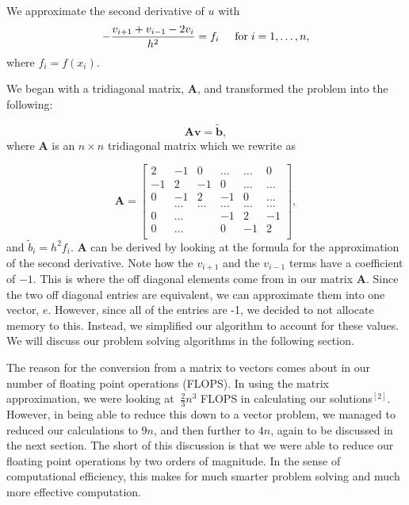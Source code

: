 \documentclass{article}
\begin{document}
We  approximate the second derivative of $u$ with
\begin{equation*}
-\frac{v_{i+1}+v_{i-1}-2v_i}{h^2} = f_i  \hspace{0.5cm} \mathrm{for} \hspace{0.1cm} i=1,\dots, n,
\end{equation*}
where $f_i=f(x_i)$.



We began with a tridiagonal matrix, $\mathbf{A}$, and transformed the problem into the following:

\begin{equation*}
\mathbf{A}\mathbf{v} = \tilde{\mathbf{b}},
\end{equation*}
where $\mathbf{A}$ is an $n\times n$  tridiagonal matrix which we rewrite as

\[
\mathbf{A} = \begin{bmatrix}
2& -1& 0 &\dots   & \dots &0 \\
-1 & 2 & -1 &0 &\dots &\dots \\
0&-1 &2 & -1 & 0 & \dots \\
& \dots   & \dots &\dots   &\dots & \dots \\
0&\dots   &  &-1 &2& -1 \\
0&\dots    &  & 0  &-1 & 2 \\
\end{bmatrix},
\]
and $\tilde{b}_i=h^2f_i$.  $\mathbf{A}$ can be derived by looking at the formula for the approximation of the second derivative. Note how the $v_{i+1}$ and the $v_{i-1}$ terms have a coefficient of $-1$. This is where the off diagonal elements come from in our matrix $\mathbf{A}$. Since the two off diagonal entries are equivalent, we can approximate them into one vector, $e$. However, since all of the entries are -1, we decided to not allocate memory to this. Instead, we simplified our algorithm to account for these values. We will discuss our problem solving algorithms in the following section.

The reason for the conversion from a matrix to vectors comes about in our number of floating point operations (FLOPS). In using the matrix approximation, we were looking at $~\frac{2}{3}n^{3}$ FLOPS in calculating our solutions$^{[2]}$. However, in being able to reduce this down to a vector problem, we managed to reduced our calculations to $9n$, and then further to $4n$, again to be discussed in the next section. The short of this discussion is that we were able to reduce our floating point operations by two orders of magnitude. In the sense of computational efficiency, this makes for much smarter problem solving and much more effective computation. 
\end{document}
